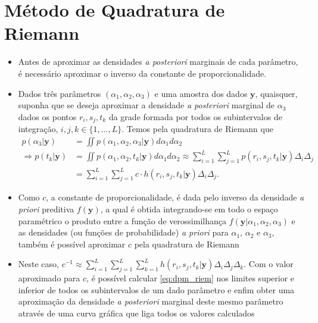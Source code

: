 \documentclass[9pt]{beamer}
\begin{document}
\section{Método de Quadratura de Riemann}
\begin{frame}
\begin{itemize}
\justifying	
\item Antes de aproximar as densidades \textit{a posteriori} marginais de cada parâmetro, é necessário aproximar o inverso da constante de proporcionalidade.
\item Dados três parâmetros $(\alpha_1, \alpha_2, \alpha_3)$ e uma amostra dos dados $\mathbf{y}$, quaisquer, suponha que se deseja aproximar a densidade \textit{a posteriori} marginal de $\alpha_3$ dados os pontos $r_i, s_j, t_k$ da grade formada por todos os subintervalos de integração, $i, j, k \in \{1, \ldots, L\}$. Temos pela quadratura de Riemann que
\begin{align}
p(\alpha_3 | \bm{y})
&= \iint p(\alpha_1, \alpha_2, \alpha_3 | \bm{y}) d\alpha_1 d\alpha_2 \nonumber \\
\Rightarrow p(t_k | \bm{y})
&= \iint p(\alpha_1, \alpha_2, t_k | \bm{y}) d\alpha_1 d\alpha_2 \approx \sum_{i=1}^{L} \sum_{j=1}^{L} p(r_i, s_j, t_k | \bm{y}) \Delta_i \Delta_j \nonumber \\
&= \sum_{i=1}^{L} \sum_{j=1}^{L} c \cdot h(r_i, s_j, t_k | \bm{y}) \Delta_i \Delta_j. \label{eq:dpm_riem}
\end{align}
\end{itemize}
\end{frame}
\begin{frame}
\begin{itemize}
\justifying	
\item Como $c$, a constante de proporcionalidade, é dada pelo inverso da densidade \textit{a priori} preditiva $f(\bm{y})$, a qual é obtida integrando-se em todo o espaço paramétrico o produto entre a função de verossimilhança $f(\bm{y} | \alpha_1, \alpha_2, \alpha_3)$ e as densidades (ou funções de probabilidade) \textit{a priori} para $\alpha_1$, $\alpha_2$ e $\alpha_3$, também é possível aproximar $c$ pela quadratura de Riemann
\item Neste caso, $c^{-1} \approx \sum_{i=1}^{L} \sum_{j=1}^{L} \sum_{k=1}^{L} h(r_i, s_j, t_k | \bm{y}) \Delta_i \Delta_j \Delta_k$. Com o valor aproximado para $c$, é possível calcular \eqref{eq:dpm_riem} nos limites superior e inferior de todos os subintervalos de um dado parâmetro e enfim obter uma aproximação da densidade \emph{a posteriori} marginal deste mesmo parâmetro através de uma curva gráfica que liga todos os valores calculados
\end{itemize}
\end{frame}
\end{document}
